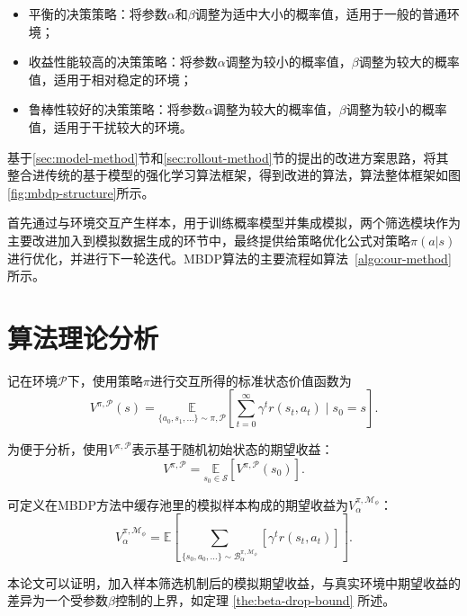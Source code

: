 \begin{itemize}
    \item 平衡的决策策略：将参数$\alpha$和$\beta$调整为适中大小的概率值，适用于一般的普通环境；
    \item 收益性能较高的决策策略：将参数$\alpha$调整为较小的概率值，$\beta$调整为较大的概率值，适用于相对稳定的环境；
    \item 鲁棒性较好的决策策略：将参数$\alpha$调整为较大的概率值，$\beta$调整为较小的概率值，适用于干扰较大的环境。
\end{itemize}

基于\ref{sec:model-method}节和\ref{sec:rollout-method}节的提出的改进方案思路，将其整合进传统的基于模型的强化学习算法框架，得到改进的算法，算法整体框架如图\ref{fig:mbdp-structure}所示。

首先通过与环境交互产生样本，用于训练概率模型并集成模拟，两个筛选模块作为主要改进加入到模拟数据生成的环节中，最终提供给策略优化公式对策略$\pi(a|s)$进行优化，并进行下一轮迭代。MBDP算法的主要流程如算法~\ref{algo:our-method}所示。

\section{算法理论分析}

记在环境$\mathcal{P}$下，使用策略$\pi$进行交互所得的标准状态价值函数为
\begin{equation}\label{def:eta-s}
    {V}^{\pi,\mathcal{P}}(s) = \underset{\{a_0,s_1,\ldots\} \sim \pi,\mathcal{P}}{\mathbb{E}}\left[\sum_{t=0}^\infty\gamma^t r(s_t,a_t)\mid s_0=s\right].
\end{equation}

为便于分析，使用${V}^{\pi,\mathcal{P}}$表示基于随机初始状态的期望收益：
\begin{equation}\label{def:eta-expectation}
    {V}^{\pi,\mathcal{P}} = \underset{s_0\in\mathcal{S}}{\mathbb{E}} \left[{V}^{\pi,\mathcal{P}}(s_0)\right].
\end{equation}

可定义在MBDP方法中缓存池里的模拟样本构成的期望收益为${V}^{\pi,\mathcal{M}_\phi}_\alpha$：
\begin{equation}\label{def:eta-beta}
    {V}^{\pi,\mathcal{M}_\phi}_\alpha=\mathbb{E}\left[{\sum}_{\{s_0,a_0,\ldots\} \sim\mathcal{B}_\alpha^{\pi,\mathcal{M}_\phi}}\left[\gamma^t r(s_t,a_t)\right]\right].
\end{equation}

本论文可以证明，加入样本筛选机制后的模拟期望收益，与真实环境中期望收益的差异为一个受参数$\beta$控制的上界，如定理 \ref{the:beta-drop-bound} 所述。

